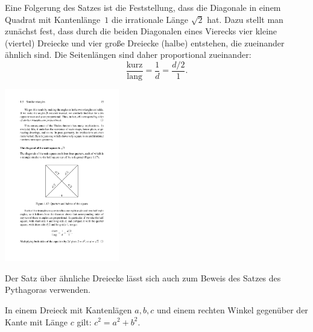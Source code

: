 Eine Folgerung des Satzes ist die Feststellung, 
dass die Diagonale in einem Quadrat mit Kantenlänge~$1$ die 
irrationale Länge $\sqrt{2}$ %
hat. Dazu stellt man zunächst fest, dass durch die beiden Diagonalen 
eines Vierecks vier kleine (viertel) Dreiecke und vier große Dreiecke
(halbe) entstehen, die zueinander ähnlich sind. Die Seitenlängen sind
daher proportional zueinander:
$$
\frac{\mbox{kurz}}{\mbox{lang}} = \frac{1}{d} = \frac{d/2}{1} .
$$


\centerline{\includegraphics[width=5cm]{BILDER/BildDiagonaleImQuadrat.pdf}}



Der Satz über ähnliche Dreiecke lässt sich auch zum Beweis des Satzes
des Pythagoras verwenden.



\begin{thm}
In einem Dreieck mit Kantenlägen $a,b,c$ und einem rechten Winkel 
gegenüber der Kante mit Länge $c$ gilt: $c^2=a^2+b^2$.
\end{thm}


